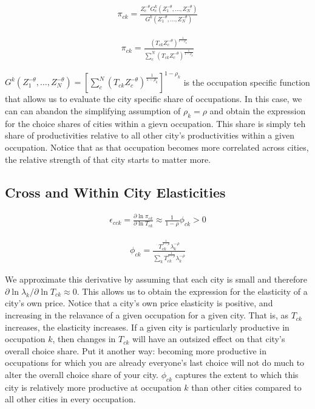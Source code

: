 \documentclass[10pt]{article}
\begin{document}
\begin{align}
    \pi_{ck} = \frac{Z_c^{- \theta} G_c^k(Z_1^{- \theta}, \dots, Z_N^{- \theta})}{G^k(Z_1^{- \theta}, \dots, Z_N^{- \theta})}
\end{align}

\begin{align}
    \pi_{ck} = \frac{(T_{ck} Z_c^{-\theta})^{\frac{1}{1 - \rho_k}}}{\sum_{c}^{N} (T_{ck} Z_c^{-\theta})^{\frac{1}{1 - \rho_k}}}
    \label{city_occuaption_shares}
\end{align}

$G^k (Z_1^{-\theta}, \dots, Z_N^{-\theta}) = [\sum_{c}^{N} (T_{ck} Z_c^{-\theta})^{\frac{1}{1 - \rho_k}}]^{1 - \rho_k}$ is the occupation specific function that allows us to evaluate the city specific share of occupations. In this case, we can can abandon the simplifying assumption of $\rho_k = \rho$ and obtain the expression for the choice shares of cities within a gievn occupation. This share is simply teh share of productivities relative to all other city's productivities within a given occupation. Notice that as that occupation becomes more correlated across cities, the relative strength of that city starts to matter more.

\subsection{Cross and Within City Elasticities}

\begin{align}
    \epsilon_{cck} = \frac{\partial \ln \pi_{ck}}{\partial \ln T_{ck}} \approx \frac{1}{1 - \rho} \phi_{ck} > 0
    \label{within_city_elasticity}
\end{align}

\begin{align}
    \phi_{ck} = \frac{T_{ck}^{\frac{1}{1 - \rho}} \lambda_k^{- \rho}}{\sum_{k}^{} T_{ck}^{\frac{1}{1 - \rho}} \lambda_k^{- \rho}}
\end{align}

We approximate this derivative by assuming that each city is small and therefore $\partial \ln \lambda_k / \partial \ln T_{ck} \approx 0$. This allows us to obtain the expression for the elasticity of a city's own price. Notice that a city's own price elasticity is positive, and increasing in the relavance of a given occupation for a given city. That is, as $T_{ck}$ increases, the elasticity increases. If a given city is particularly productive in occupation $k$, then changes in $T_{ck}$ will have an outsized effect on that city's overall choice share. Put it another way: becoming more productive in occupations for which you are already everyone's last choice will not do much to alter the overall choice share of your city. $\phi_{ck}$ captures the extent to which this city is relatively more productive at occupation $k$ than other cities compared to all other cities in every occupation.
\end{document}
